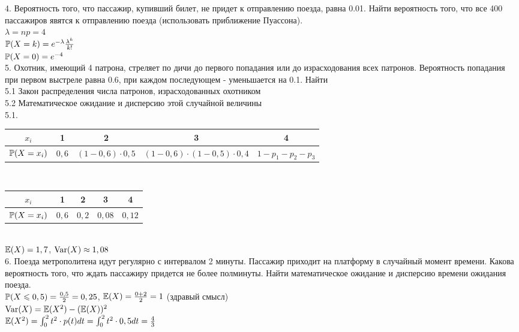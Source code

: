 \documentclass[12pt, a4paper]{article}\usepackage[]{graphicx}\usepackage[]{color}
\begin{document}
	4.  Вероятность того, что пассажир, купивший билет, не придет к
	отправлению поезда, равна 0.01. Найти вероятность того, что все
	400 пассажиров явятся к отправлению поезда (использовать
	приближение Пуассона). \\
	$\lambda=np=4$ \\
	$\P(X=k)=e^{-\lambda}\frac{\lambda^{k}}{k!}$ \\
	$\P(X=0)=e^{-4}$ \\




	5.  Охотник, имеющий 4 патрона, стреляет по дичи до первого
	попадания или до израсходования всех патронов. Вероятность
	попадания при первом выстреле равна 0.6, при каждом последующем -
	уменьшается на 0.1. Найти \\
	5.1 Закон распределения числа патронов, израсходованных охотником \\
	5.2 Математическое ожидание и дисперсию этой случайной величины \\
	5.1. \\
	\begin{tabular}{|c|c|c|c|c|}
		\hline
		$x_{i}$ & 1 & 2 & 3 & 4 \\
		\hline
		$\P(X=x_{i})$ & $0,6$& $(1-0,6)\cdot 0,5$ & $(1-0,6)\cdot(1-0,5)\cdot 0,4$ & $1-p_{1}-p_{2}-p_{3}$ \\
		\hline
	\end{tabular} \\
	\begin{tabular}{|c|c|c|c|c|}
		\hline
		$x_{i}$ & 1 & 2 & 3 & 4 \\
		\hline
		$\P(X=x_{i})$ & $0,6$& $0,2$ & $0,08$ & $0,12$ \\
		\hline
	\end{tabular} \\
	$\E(X)=1,7$, $\Var(X)\approx 1,08$ \\

	6.  Поезда метрополитена идут регулярно с интервалом 2 минуты.
	Пассажир приходит на платформу в случайный момент времени. Какова
	вероятность того, что ждать пассажиру придется не более полминуты.
	Найти математическое ожидание и дисперсию времени ожидания поезда.
	\\
	$\P(X\le 0,5)=\frac{0,5}{2}=0,25$, $\E(X)=\frac{0+2}{2}=1$ (здравый
	смысл) \\
	$\Var(X)=\E(X^{2})-(\E(X))^{2}$ \\
	$\E(X^{2})=\int_{0}^{2}t^{2}\cdot p(t)dt=\int_{0}^{2}t^{2}\cdot
	0,5dt=\frac{4}{3}$ \\
\end{document}
